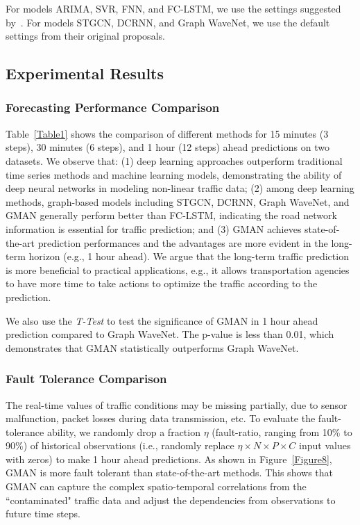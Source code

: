 \documentclass[letterpaper]{article} \usepackage{aaai20}  \usepackage{times}  \usepackage{helvet} \usepackage{courier}  \usepackage[hyphens]{url}  \usepackage{graphicx} \usepackage{amsmath}
\begin{document}
For models ARIMA, SVR, FNN, and FC-LSTM, we use the settings suggested by~\cite{Li-et-al:ICLR2018}. For models STGCN, DCRNN, and Graph WaveNet, we use the default settings from their original proposals.

\subsection{Experimental Results}

\subsubsection{Forecasting Performance Comparison}

Table~\ref{Table1} shows the comparison of different methods for 15 minutes (3 steps), 30 minutes (6 steps), and 1 hour (12 steps) ahead predictions on two datasets. We observe that: (1) deep learning approaches outperform traditional time series methods and machine learning models, demonstrating the ability of deep neural networks in modeling non-linear traffic data; (2) among deep learning methods, graph-based models including STGCN, DCRNN, Graph WaveNet, and GMAN generally perform better than FC-LSTM, indicating the road network information is essential for traffic prediction; and (3) GMAN achieves state-of-the-art prediction performances and the advantages are more evident in the long-term horizon (e.g., 1 hour ahead). We argue that the long-term traffic prediction is more beneficial to practical applications, e.g., it allows transportation agencies to have more time to take actions to optimize the traffic according to the prediction.

We also use the \textit{T-Test} to test the significance of GMAN in 1 hour ahead prediction compared to Graph WaveNet. The p-value is less than 0.01, which demonstrates that GMAN statistically outperforms Graph WaveNet.

\subsubsection{Fault Tolerance Comparison}

The real-time values of traffic conditions may be missing partially, due to sensor malfunction, packet losses during data transmission, etc. To evaluate the fault-tolerance ability, we randomly drop a fraction $ \eta $ (fault-ratio, ranging from 10\% to 90\%) of historical observations (i.e., randomly replace $ \eta \times N \times P \times C $ input values with zeros) to make 1 hour ahead predictions. As shown in Figure~\ref{Figure8}, GMAN is more fault tolerant than state-of-the-art methods. This shows that GMAN can capture the complex spatio-temporal correlations from the ``contaminated" traffic data and adjust the dependencies from observations to future time steps.
\end{document}
